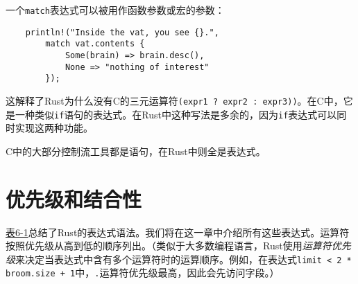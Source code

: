 一个\texttt{match}表达式可以被用作函数参数或宏的参数：
\begin{verbatim}
    println!("Inside the vat, you see {}.",
        match vat.contents {
            Some(brain) => brain.desc(),
            None => "nothing of interest"
        });
\end{verbatim}

这解释了Rust为什么没有C的三元运算符\texttt{(expr1 ? expr2 : expr3))}。在C中，它是一种类似\texttt{if}语句的表达式。在Rust中这种写法是多余的，因为\texttt{if}表达式可以同时实现这两种功能。

C中的大部分控制流工具都是语句，在Rust中则全是表达式。

\section{优先级和结合性}

\hyperref[t6-1]{表6-1}总结了Rust的表达式语法。我们将在这一章中介绍所有这些表达式。运算符按照优先级从高到低的顺序列出。（类似于大多数编程语言，Rust使用\emph{运算符优先级}来决定当表达式中含有多个运算符时的运算顺序。例如，在表达式\texttt{limit < 2 * broom.size + 1}中，\texttt{.}运算符优先级最高，因此会先访问字段。）


